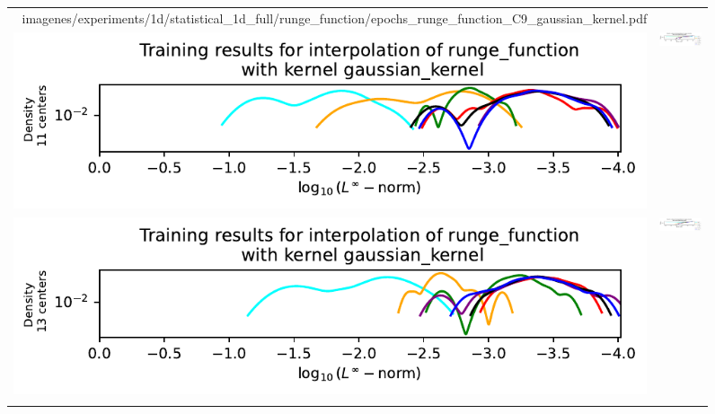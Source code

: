 \documentclass[12pt]{report} %
\begin{document}
\begin{figure}[H]
\begin{tabular}{rl}
{        {imagenes/experiments/1d/statistical_1d_full/runge_function/epochs_runge_function_C9_gaussian_kernel.pdf}}
    \\
    {\includegraphics[width=.68\textwidth, trim={.58cm 1.25cm 0 1.17cm},clip=true]
    {imagenes/experiments/1d/statistical_1d_full/runge_function/linf_runge_function_C11_gaussian_kernel.pdf}} & {\includegraphics[width=.62\textwidth, trim={1cm 2.4cm 2.88cm 1.17cm},clip=true]
    {imagenes/experiments/1d/statistical_1d_full/runge_function/epochs_runge_function_C11_gaussian_kernel.pdf}}                                                                                     \\
    {\includegraphics[width=.68\textwidth, trim={.58cm 1.25cm 0 1.17cm},clip=true]
    {imagenes/experiments/1d/statistical_1d_full/runge_function/linf_runge_function_C13_gaussian_kernel.pdf}} & {\includegraphics[width=.62\textwidth, trim={1cm 2.4cm 2.88cm 1.17cm},clip=true]
        {imagenes/experiments/1d/statistical_1d_full/runge_function/epochs_runge_function_C13_gaussian_kernel.pdf}}
    \\
    {\includegraphics[width=.68\textwidth, trim={.58cm 0.2cm 0 1.17cm},clip=true]
}
\end{tabular}
\end{figure}
\end{document}
